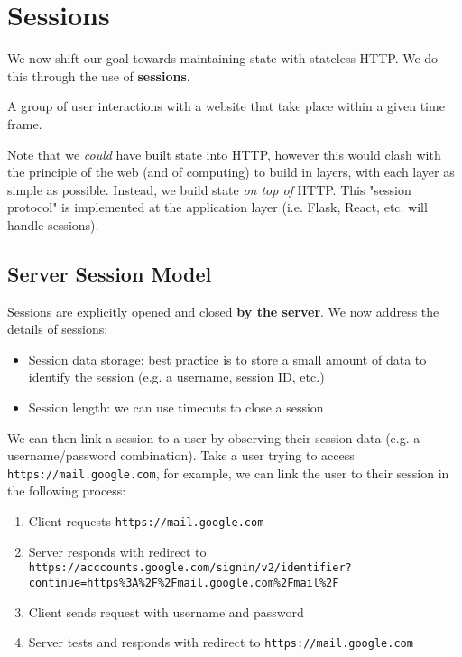 \section{Sessions}
We now shift our goal towards maintaining state with stateless HTTP. We do this through the use of \textbf{sessions}.

\begin{definition}[Session]
	A group of user interactions with a website that take place within a given time frame.
\end{definition}

Note that we \emph{could} have built state into HTTP, however this would clash with the principle of the web (and of computing) to build in layers, with each layer as simple as possible. Instead, we build state \emph{on top of} HTTP. This "session protocol" is implemented at the application layer (i.e. Flask, React, etc. will handle sessions).

\subsection{Server Session Model}
Sessions are explicitly opened and closed \textbf{by the server}. We now address the details of sessions:
\begin{itemize}
	\item Session data storage: best practice is to store a small amount of data to identify the session (e.g. a username, session ID, etc.)
	\item Session length: we can use timeouts to close a session
\end{itemize}

We can then link a session to a user by observing their session data (e.g. a username/password combination). Take a user trying to access \texttt{https://mail.google.com}, for example, we can link the user to their session in the following process:
\begin{enumerate}
	\item Client requests \texttt{https://mail.google.com}
	\item Server responds with redirect to \texttt{https://acccounts.google.com/signin/v2/identifier? \\ continue=https\%3A\%2F\%2Fmail.google.com\%2Fmail\%2F}
	\item Client sends request with username and password
	\item Server tests and responds with redirect to \texttt{https://mail.google.com}
\end{enumerate}

